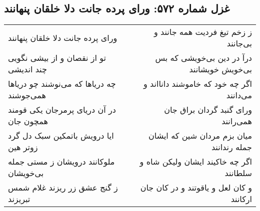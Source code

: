 \begin{center}
\section*{غزل شماره ۵۷۲: ورای پرده جانت دلا خلقان پنهانند}
\label{sec:0572}
\begin{longtable}{l p{0.5cm} r}
ورای پرده جانت دلا خلقان پنهانند
&&
ز زخم تیغ فردیت همه جانند و بی‌جانند
\\
تو از نقصان و از بیشی نگویی چند اندیشی
&&
درآ در دین بی‌خویشی که بس بی‌خویش خویشانند
\\
چه دریاها که می‌نوشند چو دریاها همی‌جوشند
&&
اگر چه خود که خاموشند دانااند و می‌دانند
\\
در آن دریای پرمرجان یکی قومند همچون جان
&&
ورای گنبد گردان براق جان همی‌رانند
\\
ایا درویش باتمکین سبک دل گرد زوتر هین
&&
میان بزم مردان شین که ایشان جمله رندانند
\\
ملوکانند درویشان ز مستی جمله بی‌خویشان
&&
اگر چه خاکیند ایشان ولیکن شاه و سلطانند
\\
ز گنج عشق زر ریزند غلام شمس تبریزند
&&
و کان لعل و یاقوتند و در کان جان ارکانند
\\
\end{longtable}
\end{center}
